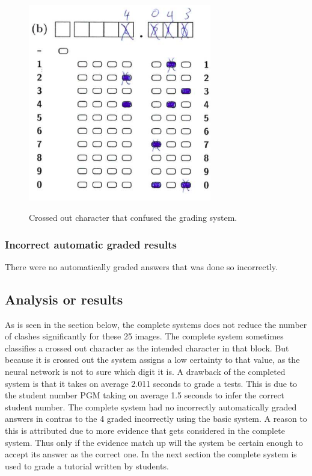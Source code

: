 \begin{figure}
  \centering
  \includegraphics[width=8cm]{crossedOutCharacter}\\
  \caption{Crossed out character that confused the grading system.}
  \label{fig:crossedOutCharacter}
\end{figure}

\subsubsection{Incorrect automatic graded results}

There were no automatically graded answers that was done so incorrectly.

\subsection{Analysis or results}

As is seen in the section below, the complete systems does not reduce the number of clashes significantly for these 25 images. The complete system sometimes classifies a crossed out character as the intended character in that block. But because it is crossed out the system assigns a low certainty to that value, as the neural network is not to sure which digit it is. A drawback of the completed system is that it takes on average 2.011 seconds to grade a tests. This is due to the student number PGM taking on average 1.5 seconds to infer the correct student number. The complete system had no incorrectly automatically graded answers in contras to the 4 graded incorrectly using the basic system. A reason to this is attributed due to more evidence that gets considered in the complete system. Thus only if the evidence match up will the system be certain enough to accept its answer as the correct one. In the next section the complete system is used to grade a tutorial written by students. 

